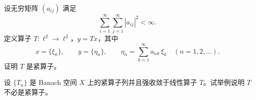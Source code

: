 \begin{homework}[3.27]
设无穷矩阵 $(a_{ij})$ 满足  
\[
\sum_{i=1}^\infty\sum_{j=1}^\infty |a_{ij}|^2<\infty.
\]
定义算子 $T:\ell^2\to \ell^2$，$y=Tx$，其中  
\[
x=\{\xi_k\},\qquad y=\{\eta_n\},\qquad 
\eta_n=\sum_{k=1}^\infty a_{nk}\,\xi_k\quad (n=1,2,\ldots).
\]
证明 $T$ 是紧算子。
\end{homework}

\begin{homework}[3.28]
设 $\{T_n\}$ 是 Banach 空间 $X$ 上的紧算子列并且强收敛于线性算子 $T$。试举例说明 $T$ 不必是紧算子。
\end{homework}
